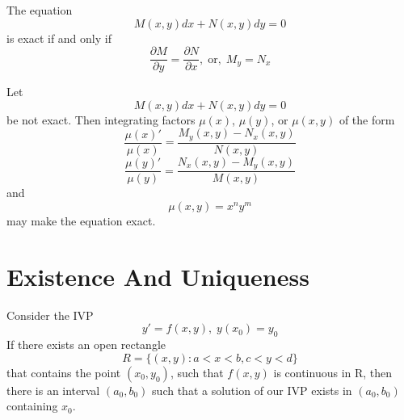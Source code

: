 \documentclass[12pt, a4paper, oneside, openright, titlepage]{book}
\begin{document}


\begin{defn}[Conditions]
        The equation \begin{equation}
                M(x,y)dx + N(x,y)dy = 0
        \end{equation}
        is exact if and only if \begin{equation}
                \frac{\partial M}{\partial y} = \frac{\partial N}{\partial x},\;\text{or},\;M_y = N_x 
        \end{equation}
\end{defn}




\begin{thm}
        Let \begin{equation}
                M(x,y)dx + N(x,y)dy = 0
        \end{equation}
        be not exact. Then integrating factors $\mu(x)$, $\mu(y)$, or $\mu(x,y)$ of the form \begin{equation}
                \frac{\mu(x)'}{\mu(x)} = \frac{M_y(x,y) - N_x(x,y)}{N(x,y)}
        \end{equation}
        \begin{equation}
                \frac{\mu(y)'}{\mu(y)} = \frac{N_x(x,y) - M_y(x,y)}{M(x,y)}
        \end{equation}
        and \begin{equation}
                \mu(x,y) = x^ny^m
        \end{equation}
        may make the equation exact.
\end{thm}




\section{Existence And Uniqueness}


\begin{thm}[Existence]
        Consider the IVP \begin{equation}
                y' = f(x,y),\;y(x_0) =y_0
        \end{equation}
        If there exists an open rectangle \begin{equation}
                R = \{(x,y):a < x < b, c< y < d\}
        \end{equation}
        that contains the point $(x_0,y_0)$, such that $f(x,y)$ is continuous in R, then there is an interval $(a_0,b_0)$ such that a solution of our IVP exists in $(a_0,b_0)$ containing $x_0$.
\end{thm}
\end{document}
